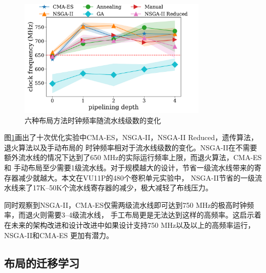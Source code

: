 \begin{figure}[h]
	\centering
	\includegraphics[width=0.8\textwidth]{figure/frequency_depth}
	\caption{六种布局方法时钟频率随流水线级数的变化} 
	\label{fig:freq_depth}
\end{figure}

图\ref{fig:freq_depth}画出了十次优化实验中CMA-ES，NSGA-II，NSGA-II Reduced，遗传算法，退火算法以及手动布局的
时钟频率相对于流水线级数的变化。NSGA-II在不需要额外流水线的情况下达到了650 MHz的实际运行频率上限，而退火算法，CMA-ES和
手动布局至少需要1级流水线。对于规模越大的设计，节省一级流水线带来的寄存器减少就越大。本文在VU11P的480个卷积单元实验中，
NSGA-II节省的一级流水线来了17K--50K个流水线寄存器的减少，极大减轻了布线压力。

同时观察到NSGA-II，CMA-ES仅需两级流水线即可达到750 MHz的极高时钟频率，而退火则需要3--4级流水线，
手工布局更是无法达到这样的高频率。这启示着在未来的架构改进和设计改进中如果设计支持750 MHz以及以上的高频率运行，NSGA-II和CMA-ES
更加有潜力。



\subsection{布局的迁移学习}

